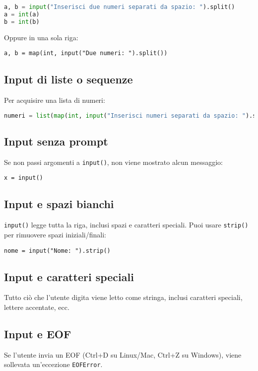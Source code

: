 \documentclass[a4paper,12pt]{article}
\begin{document}
\begin{lstlisting}[language=Python, basicstyle=\ttfamily\footnotesize, breaklines=true, frame=single]
a, b = input("Inserisci due numeri separati da spazio: ").split()
a = int(a)
b = int(b)
\end{lstlisting}

Oppure in una sola riga:

\begin{lstlisting}
a, b = map(int, input("Due numeri: ").split())
\end{lstlisting}

\subsection*{Input di liste o sequenze}
Per acquisire una lista di numeri:

\begin{lstlisting}[language=Python, basicstyle=\ttfamily\footnotesize, breaklines=true, frame=single]
numeri = list(map(int, input("Inserisci numeri separati da spazio: ").split()))
\end{lstlisting}

\subsection*{Input senza prompt}
Se non passi argomenti a \texttt{input()}, non viene mostrato alcun messaggio:

\begin{lstlisting}
x = input()
\end{lstlisting}

\subsection*{Input e spazi bianchi}
\texttt{input()} legge tutta la riga, inclusi spazi e caratteri speciali. Puoi usare \texttt{strip()} per rimuovere spazi iniziali/finali:

\begin{lstlisting}
nome = input("Nome: ").strip()
\end{lstlisting}

\subsection*{Input e caratteri speciali}
Tutto ciò che l'utente digita viene letto come stringa, inclusi caratteri speciali, lettere accentate, ecc.

\subsection*{Input e EOF}
Se l'utente invia un EOF (Ctrl+D su Linux/Mac, Ctrl+Z su Windows), viene sollevata un'eccezione \texttt{EOFError}.
\end{document}
